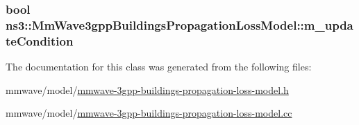 \subsubsection[{\texorpdfstring{m\+\_\+update\+Condition}{m_updateCondition}}]{\setlength{\rightskip}{0pt plus 5cm}bool ns3\+::\+Mm\+Wave3gpp\+Buildings\+Propagation\+Loss\+Model\+::m\+\_\+update\+Condition\hspace{0.3cm}{\ttfamily [private]}}\hypertarget{classns3_1_1MmWave3gppBuildingsPropagationLossModel_a2011a4d9cee62e274925719f9a9f4728}{}\label{classns3_1_1MmWave3gppBuildingsPropagationLossModel_a2011a4d9cee62e274925719f9a9f4728}


The documentation for this class was generated from the following files\+:\begin{DoxyCompactItemize}
\item 
mmwave/model/\hyperlink{mmwave-3gpp-buildings-propagation-loss-model_8h}{mmwave-\/3gpp-\/buildings-\/propagation-\/loss-\/model.\+h}\item 
mmwave/model/\hyperlink{mmwave-3gpp-buildings-propagation-loss-model_8cc}{mmwave-\/3gpp-\/buildings-\/propagation-\/loss-\/model.\+cc}\end{DoxyCompactItemize}
